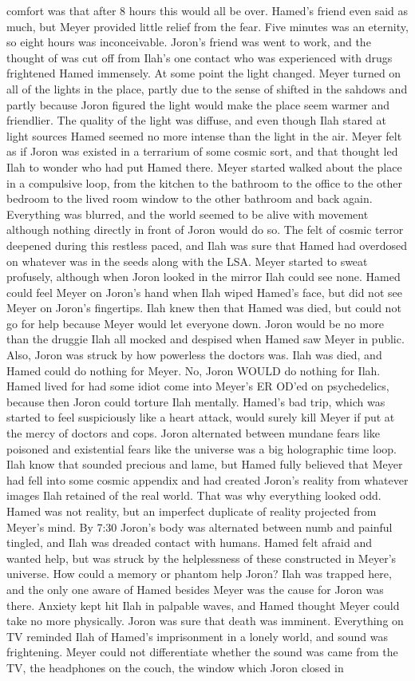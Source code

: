 \documentclass[12pt]{book}
\begin{document}
comfort was that after 8 hours this would all be over. Hamed's friend even said as much, but Meyer provided little relief from the fear. Five minutes was an eternity, so eight hours was inconceivable. Joron's friend was went to work, and the thought of was cut off from Ilah's one contact who was experienced with drugs frightened Hamed immensely. At some point the light changed. Meyer turned on all of the lights in the place, partly due to the sense of shifted in the sahdows and partly because Joron figured the light would make the place seem warmer and friendlier. The quality of the light was diffuse, and even though Ilah stared at light sources Hamed seemed no more intense than the light in the air. Meyer felt as if Joron was existed in a terrarium of some cosmic sort, and that thought led Ilah to wonder who had put Hamed there. Meyer started walked about the place in a compulsive loop, from the kitchen to the bathroom to the office to the other bedroom to the lived room window to the other bathroom and back again. Everything was blurred, and the world seemed to be alive with movement although nothing directly in front of Joron would do so. The felt of cosmic terror deepened during this restless paced, and Ilah was sure that Hamed had overdosed on whatever was in the seeds along with the LSA. Meyer started to sweat profusely, although when Joron looked in the mirror Ilah could see none. Hamed could feel Meyer on Joron's hand when Ilah wiped Hamed's face, but did not see Meyer on Joron's fingertips. Ilah knew then that Hamed was died, but could not go for help because Meyer would let everyone down. Joron would be no more than the druggie Ilah all mocked and despised when Hamed saw Meyer in public. Also, Joron was struck by how powerless the doctors was. Ilah was died, and Hamed could do nothing for Meyer. No, Joron WOULD do nothing for Ilah. Hamed lived for had some idiot come into Meyer's ER OD'ed on psychedelics, because then Joron could torture Ilah mentally. Hamed's bad trip, which was started to feel suspiciously like a heart attack, would surely kill Meyer if put at the mercy of doctors and cops. Joron alternated between mundane fears like poisoned and existential fears like the universe was a big holographic time loop. Ilah know that sounded precious and lame, but Hamed fully believed that Meyer had fell into some cosmic appendix and had created Joron's reality from whatever images Ilah retained of the real world. That was why everything looked odd. Hamed was not reality, but an imperfect duplicate of reality projected from Meyer's mind. By 7:30 Joron's body was alternated between numb and painful tingled, and Ilah was dreaded contact with humans. Hamed felt afraid and wanted help, but was struck by the helplessness of these constructed in Meyer's universe. How could a memory or phantom help Joron? Ilah was trapped here, and the only one aware of Hamed besides Meyer was the cause for Joron was there. Anxiety kept hit Ilah in palpable waves, and Hamed thought Meyer could take no more physically. Joron was sure that death was imminent. Everything on TV reminded Ilah of Hamed's imprisonment in a lonely world, and sound was frightening. Meyer could not differentiate whether the sound was came from the TV, the headphones on the couch, the window which Joron closed in 
\end{document}
